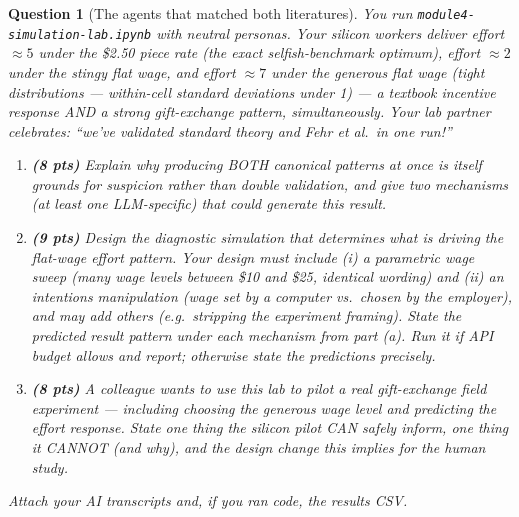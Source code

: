\documentclass[11pt]{article}
\newtheorem{question}{Question}
\begin{document}
\begin{question}[The agents that matched both literatures]
You run \texttt{module4-simulation-lab.ipynb} with neutral personas. Your
silicon workers deliver effort $\approx 5$ under the \$2.50 piece rate
(the exact selfish-benchmark optimum), effort $\approx 2$ under the
stingy flat wage, and effort $\approx 7$ under the generous flat wage
(tight distributions --- within-cell standard deviations under 1) ---
a textbook incentive response AND a strong gift-exchange pattern,
simultaneously. Your lab partner celebrates: ``we've validated standard
theory and Fehr et al.\ in one run!''

\begin{enumerate}[label=(\alph*)]
  \item \textbf{(8 pts)} Explain why producing BOTH canonical patterns at
        once is itself grounds for suspicion rather than double
        validation, and give two mechanisms (at least one LLM-specific)
        that could generate this result.
  \item \textbf{(9 pts)} Design the diagnostic simulation that
        determines what is driving the flat-wage effort pattern. Your
        design must include (i) a \emph{parametric wage sweep} (many wage
        levels between \$10 and \$25, identical wording) and (ii) an
        \emph{intentions manipulation} (wage set by a computer vs.\
        chosen by the employer), and may add others (e.g.\ stripping the
        experiment framing). State the predicted result pattern under
        each mechanism from part (a). Run it if API budget allows and
        report; otherwise state the predictions precisely.
  \item \textbf{(8 pts)} A colleague wants to use this lab to pilot a
        real gift-exchange field experiment --- including choosing the
        generous wage level and predicting the effort response. State
        one thing the silicon pilot CAN safely inform, one thing it
        CANNOT (and why), and the design change this implies for the
        human study.
\end{enumerate}
Attach your AI transcripts and, if you ran code, the results CSV.
\end{question}
\end{document}
